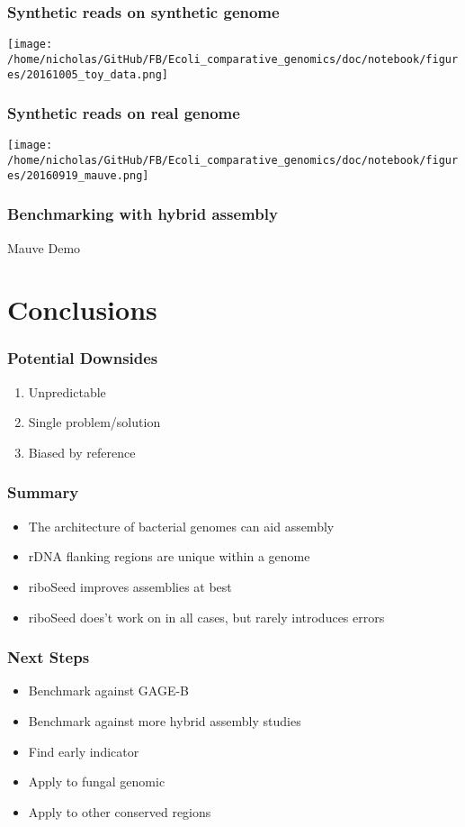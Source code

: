 \documentclass[10pt, compress]{beamer}
\begin{document}
\begin{frame}[fragile]
  \frametitle{Synthetic reads on synthetic genome}
  \hspace*{-0cm}
  \texttt{[image: /home/nicholas/GitHub/FB/Ecoli\_comparative\_genomics/doc/notebook/figures/20161005\_toy\_data.png]}
\end{frame}

\begin{frame}[fragile]
  \frametitle{Synthetic reads on real genome}
  \hspace*{-0cm}
  \texttt{[image: /home/nicholas/GitHub/FB/Ecoli\_comparative\_genomics/doc/notebook/figures/20160919\_mauve.png]}
\end{frame}

\begin{frame}[fragile]
  \frametitle{Benchmarking with hybrid assembly}
  Mauve Demo
\end{frame}

\section{Conclusions}
 \begin{frame}[fragile]
  \frametitle{Potential Downsides}
\begin{enumerate}
  \item Unpredictable
  \item Single problem/solution
  \item Biased by reference
\end{enumerate}
\end{frame}

 \begin{frame}[fragile]
  \frametitle{Summary}
  \begin{itemize}[<+- | alert@+>]
  \item The architecture of bacterial genomes can aid assembly
  \item rDNA flanking regions are unique within a genome
  \item riboSeed improves assemblies at best
  \item riboSeed does't work on in all cases, but rarely introduces errors
  \end{itemize}
\end{frame}

\begin{frame}[fragile]
  \frametitle{Next Steps}
  \begin{itemize}
  \item Benchmark against GAGE-B
  \item Benchmark against more hybrid assembly studies
  \item Find early indicator
  \item Apply to fungal genomic
  \item Apply to other conserved regions
  \end{itemize}
\end{frame}
\end{document}
